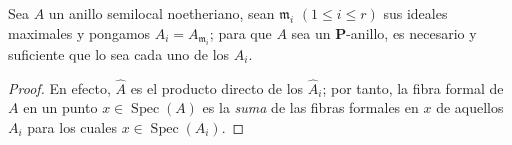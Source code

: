 \begin{proposition}[7.3.14]
\label{IV.2.s7.3.14-fr}
Sea $A$ un anillo semilocal noetheriano, sean $\mathfrak m_i$
$(1\leqslant i\leqslant r)$ sus ideales maximales y pongamos
$A_i=A_{\mathfrak m_i}$; para que $A$ sea un $\boldsymbol P$-anillo,
es necesario y suficiente que lo sea cada uno de los $A_i$.
\end{proposition}

\begin{proof}
En efecto, $\widehat A$ es el producto directo de los $\widehat A_i$;
por tanto, la fibra formal de $A$ en un punto
$x\in\operatorname{Spec}(A)$ es la \emph{suma} de las fibras formales en
$x$ de aquellos $A_i$ para los cuales
$x\in\operatorname{Spec}(A_i)$.
\end{proof}
